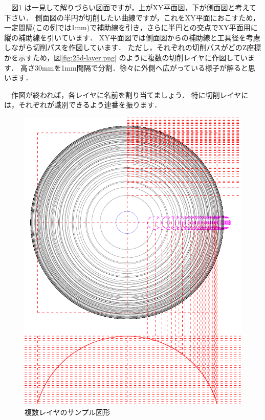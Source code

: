 \begin{minipage}[t]{0.5\textwidth}
　図\ref{fig:25d.pdf} は一見して解りづらい図面ですが，上がXY平面図，下が側面図と考えて下さい．
側面図の半円が切削したい曲線ですが，これをXY平面におこすため，一定間隔(この例では1mm)で補助線を引き，さらに半円との交点でXY平面用に縦の補助線を引いています．
XY平面図では側面図からの補助線と工具径を考慮しながら切削パスを作図しています．
ただし，それぞれの切削パスがどのZ座標かを示すため，図\ref{fig:25d-layer.png} のように複数\footnotemark[1]
の切削レイヤに作図しています．
高さ30mmを1mm間隔で分割．徐々に外側へ広がっている様子が解ると思います．

　作図が終われば，各レイヤに名前を割り当てましょう．
特に切削レイヤには，それぞれが識別できるよう連番を振ります．
\end{minipage}
\begin{minipage}[t]{0.5\textwidth}
\vspace*{-2zh}
\begin{figure}[H]
\centering
\includegraphics[width=\textwidth]{No3/fig/25d-crop.pdf}
\caption{複数レイヤのサンプル図形}
\label{fig:25d.pdf}
\end{figure}
\end{minipage}

